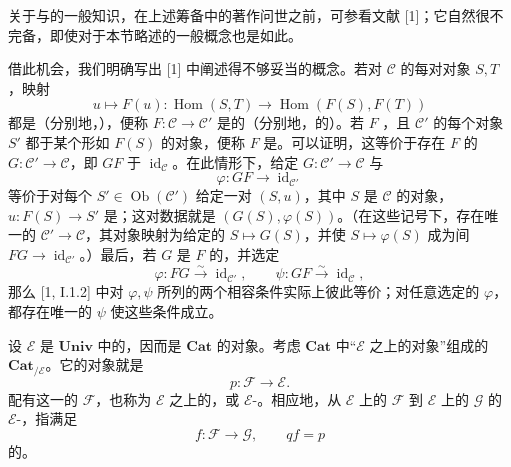 关于与的一般知识，在上述筹备中的著作问世之前，可参看文献 [1]；它自然很不完备，即使对于本节略述的一般概念也是如此。

借此机会，我们明确写出 [1] 中阐述得不够妥当的概念。若对 $\mathcal C$ 的每对对象 $S,T$，映射
\[
 u\longmapsto F(u):\operatorname{Hom}(S,T)\longrightarrow
 \operatorname{Hom}(F(S),F(T))
\]
都是（分别地，），便称 $F:\mathcal C\to\mathcal C'$ 是的（分别地，的）。若 $F$ ，且 $\mathcal C'$ 的每个对象 $S'$ 都于某个形如 $F(S)$ 的对象，便称 $F$ 是。可以证明，这等价于存在 $F$ 的 $G:\mathcal C'\to\mathcal C$，即 $GF$ 于 $\operatorname{id}_{\mathcal C}$。在此情形下，给定 $G:\mathcal C'\to\mathcal C$ 与
\[
 \varphi:GF\longrightarrow\operatorname{id}_{\mathcal C'}
\]
等价于对每个 $S'\in\operatorname{Ob}(\mathcal C')$ 给定一对 $(S,u)$，其中 $S$ 是 $\mathcal C$ 的对象，$u:F(S)\to S'$ 是；这对数据就是 $(G(S),\varphi(S))$。（在这些记号下，存在唯一的 $\mathcal C'\to\mathcal C$，其对象映射为给定的 $S\mapsto G(S)$，并使 $S\mapsto\varphi(S)$ 成为间 $FG\to\operatorname{id}_{\mathcal C'}$。）最后，若 $G$ 是 $F$ 的，并选定
\[
 \varphi:FG\xrightarrow{\sim}\operatorname{id}_{\mathcal C'},\qquad
 \psi:GF\xrightarrow{\sim}\operatorname{id}_{\mathcal C},
\]
那么 [1, I.1.2] 中对 $\varphi,\psi$ 所列的两个相容条件实际上彼此等价；对任意选定的 $\varphi$，都存在唯一的 $\psi$ 使这些条件成立。

设 $\mathcal E$ 是 $\mathbf{Univ}$ 中的，因而是 $\mathbf{Cat}$ 的对象。考虑 $\mathbf{Cat}$ 中“$\mathcal E$ 之上的对象”组成的 $\mathbf{Cat}_{/\mathcal E}$。它的对象就是
\[
 p:\mathcal F\longrightarrow\mathcal E.
\]
配有这一的 $\mathcal F$，也称为 $\mathcal E$ 之上的，或 $\mathcal E$-。相应地，从 $\mathcal E$ 上的 $\mathcal F$ 到 $\mathcal E$ 上的 $\mathcal G$ 的 $\mathcal E$-，指满足
\[
 f:\mathcal F\longrightarrow\mathcal G,\qquad qf=p
\]
的。

